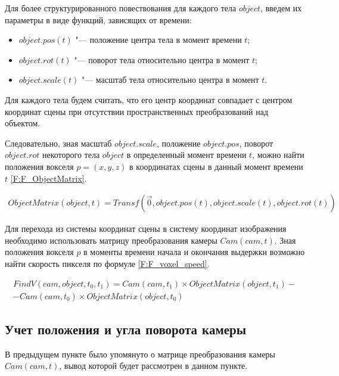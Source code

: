 Для более структурированного повествования для каждого тела $object$, введем их параметры в виде функций, зависящих от времени:
\begin{itemize}
    \item $object.pos(t)$ "--- положение центра тела в момент времени $t$;
    \item $object.rot(t)$ "--- поворот тела относительно центра в момент $t$;
    \item $object.scale(t)$ "--- масштаб тела относительно центра в момент $t$.
\end{itemize}

Для каждого тела будем считать, что его центр координат совпадает с центром координат сцены при отсутствии пространственных преобразований над объектом. 

Следовательно, зная масштаб $object.scale$, положение $object.pos$, поворот $object.rot$ некоторого тела $object$ в определенный момент времени $t$, можно найти положения вокселя $p = (x,y,z)$ в координатах сцены в данный момент времени $t$ \eqref{F:F_ObjectMatrix}.


\begin{equation}
    \label{F:F_ObjectMatrix}
    \begin{matrix}
        {
            ObjectMatrix(object, t) =
            Transf(
                \vec{0},
                object.pos(t),
                object.scale(t),
                object.rot(t)
            )}
    \end{matrix}
\end{equation}

Для перехода из системы координат сцены в систему координат изображения необходимо использовать матрицу преобразования камеры $Cam(cam, t)$. Зная положения вокселя $p$ в моменты времени начала и окончания выдержки возможно найти скорость пикселя по формуле \eqref{F:F_voxel_speed}.



\begin{equation}
    \label{F:F_voxel_speed}
    \begin{matrix}
        {FindV(cam, object, t_0, t_1) = Cam(cam, t_1) \times ObjectMatrix(object, t_1) - }\\{
          - Cam(cam, t_0) \times ObjectMatrix(object, t_0)}
    \end{matrix}
\end{equation}


\subsection{Учет положения и угла поворота камеры}
В предыдущем пункте было упомянуто о матрице преобразования камеры $Cam(cam, t)$, вывод которой будет рассмотрен в данном пункте.

